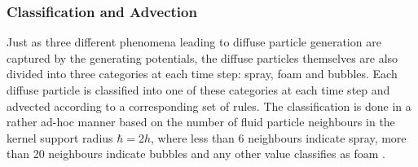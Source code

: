 \documentclass[oneside, a4paper]{book}
\begin{document}
  \subsubsection{Classification and Advection}
  Just as three different phenomena leading to diffuse particle generation are captured by the generating potentials, the diffuse particles themselves are also divided into three categories at each time step: spray, foam and bubbles. Each diffuse particle is classified into one of these categories at each time step and advected according to a corresponding set of rules. The classification is done in a rather ad-hoc manner based on the number of fluid particle neighbours in the kernel support radius $\hbar = 2h$, where less than 6 neighbours indicate spray, more than 20 neighbours indicate bubbles and any other value classifies as foam \autocite{turbulent-micropolar-foam}.
\end{document}
